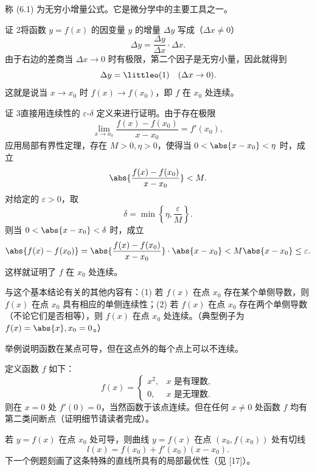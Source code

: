 \begin{xremark}
称 (6.1) 为无穷小增量公式。它是微分学中的主要工具之一。
\end{xremark}

\begin{xproof}
证 2\quad 将函数 $y=f(x)$ 的因变量 $y$ 的增量 $\Delta y$ 写成（$\Delta x\ne0$）
\[
  \Delta y=\frac{\Delta y}{\Delta x}\cdot\Delta x.
\]
由于右边的差商当 $\Delta x\to0$ 时有极限，第二个因子是无穷小量，因此就得到
\[
  \Delta y=\littleo(1)\quad(\Delta x\to0).
\]
这就是说当 $x\to x_0$ 时 $f(x)\to f(x_0)$，即 $f$ 在 $x_0$ 处连续。
\end{xproof}

\begin{xproof}
证 3\quad 直接用连续性的 $\varepsilon$-$\delta$ 定义来进行证明。由于存在极限
\[
  \lim_{x\to x_0}\frac{f(x)-f(x_0)}{x-x_0}=f'(x_0),
\]
应用局部有界性定理，存在 $M>0,\eta>0$，使得当 $0<\abs{x-x_0}<\eta$ 时，成立
\[
  \abs{\frac{f(x)-f(x_0)}{x-x_0}}<M.
\]
对给定的 $\varepsilon>0$，取
\[
  \delta=\min\left\{\eta,\frac{\varepsilon}{M}\right\}.
\]
则当 $0<\abs{x-x_0}<\delta$ 时，成立
\[
  \abs{f(x)-f(x_0)}
  =\abs{\frac{f(x)-f(x_0)}{x-x_0}}\cdot\abs{x-x_0}
  <M\abs{x-x_0}\le\varepsilon.
\]
这样就证明了 $f$ 在 $x_0$ 处连续。
\end{xproof}

\begin{xremark}
与这个基本结论有关的其他内容有：(1) 若 $f(x)$ 在点 $x_0$ 存在某个单侧导数，则 $f(x)$ 在点 $x_0$ 具有相应的单侧连续性；(2) 若 $f(x)$ 在点 $x_0$ 存在两个单侧导数（不论它们是否相等），则 $f(x)$ 在点 $x_0$ 处连续。（典型例子为 $f(x)=\abs{x},x_0=0$。）
\end{xremark}

\begin{xexample}[6.1.2]
举例说明函数在某点可导，但在这点外的每个点上可以不连续。
\end{xexample}
\begin{xsolution}
定义函数 $f$ 如下：
\[
  f(x)=
  \begin{cases}
    x^2, & x\text{ 是有理数},\\
    0,   & x\text{ 是无理数}.
  \end{cases}
\]
则在 $x=0$ 处 $f'(0)=0$，当然函数于该点连续。但在任何 $x\ne0$ 处函数 $f$ 均有第二类间断点（证明细节请读者完成）。
\end{xsolution}

若 $y=f(x)$ 在点 $x_0$ 处可导，则曲线 $y=f(x)$ 在点 $(x_0,f(x_0))$ 处有切线
\[
  l(x)=f(x_0)+f'(x_0)(x-x_0).
\]
下一个例题刻画了这条特殊的直线所具有的局部最优性（见 [17]）。

